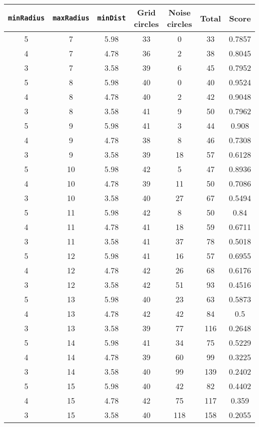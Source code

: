\documentclass[letterpaper, 12pt]{article}
\begin{document}
\begin{longtable}{|c|c|c|c|c|c|c|}
\hline
\textbf{\texttt{minRadius}} & \textbf{\texttt{maxRadius}} & \textbf{\texttt{minDist}} & \textbf{Grid circles} & \textbf{Noise circles} & \textbf{Total} & \textbf{Score} \\
\hline
5 & 7 & 5.98 & 33 & 0 & 33 & 0.7857 \\
\hline
4 & 7 & 4.78 & 36 & 2 & 38 & 0.8045 \\
\hline
3 & 7 & 3.58 & 39 & 6 & 45 & 0.7952 \\
\hline
5 & 8 & 5.98 & 40 & 0 & 40 & 0.9524 \\
\hline
4 & 8 & 4.78 & 40 & 2 & 42 & 0.9048 \\
\hline
3 & 8 & 3.58 & 41 & 9 & 50 & 0.7962 \\
\hline
5 & 9 & 5.98 & 41 & 3 & 44 & 0.908 \\
\hline
4 & 9 & 4.78 & 38 & 8 & 46 & 0.7308 \\
\hline
3 & 9 & 3.58 & 39 & 18 & 57 & 0.6128 \\
\hline
5 & 10 & 5.98 & 42 & 5 & 47 & 0.8936 \\
\hline
4 & 10 & 4.78 & 39 & 11 & 50 & 0.7086 \\
\hline
3 & 10 & 3.58 & 40 & 27 & 67 & 0.5494 \\
\hline
5 & 11 & 5.98 & 42 & 8 & 50 & 0.84 \\
\hline
4 & 11 & 4.78 & 41 & 18 & 59 & 0.6711 \\
\hline
3 & 11 & 3.58 & 41 & 37 & 78 & 0.5018 \\
\hline
5 & 12 & 5.98 & 41 & 16 & 57 & 0.6955 \\
\hline
4 & 12 & 4.78 & 42 & 26 & 68 & 0.6176 \\
\hline
3 & 12 & 3.58 & 42 & 51 & 93 & 0.4516 \\
\hline
5 & 13 & 5.98 & 40 & 23 & 63 & 0.5873 \\
\hline
4 & 13 & 4.78 & 42 & 42 & 84 & 0.5 \\
\hline
3 & 13 & 3.58 & 39 & 77 & 116 & 0.2648 \\
\hline
5 & 14 & 5.98 & 41 & 34 & 75 & 0.5229 \\
\hline
4 & 14 & 4.78 & 39 & 60 & 99 & 0.3225 \\
\hline
3 & 14 & 3.58 & 40 & 99 & 139 & 0.2402 \\
\hline
5 & 15 & 5.98 & 40 & 42 & 82 & 0.4402 \\
\hline
4 & 15 & 4.78 & 42 & 75 & 117 & 0.359 \\
\hline
3 & 15 & 3.58 & 40 & 118 & 158 & 0.2055 \\

\end{longtable}
\end{document}
